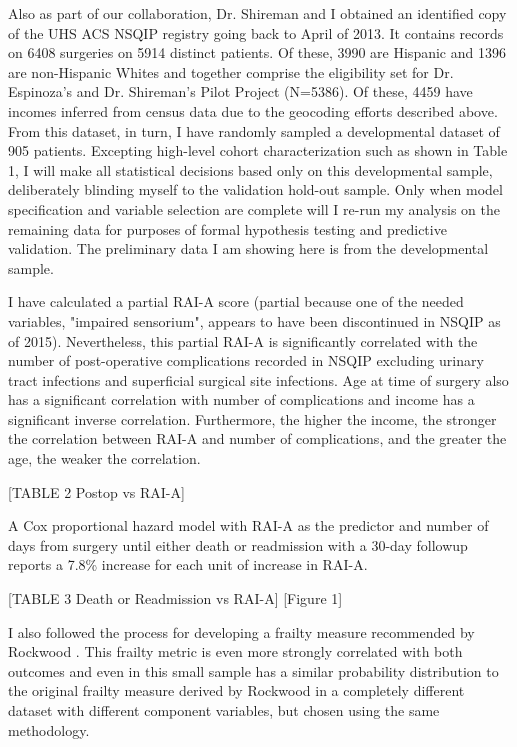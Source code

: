 Also as part of our collaboration, Dr. Shireman and I obtained an identified copy of the UHS ACS NSQIP registry going back to April of 2013. It contains records on 6408 surgeries on 5914 distinct patients. Of these, 3990 are Hispanic and 1396 are non-Hispanic Whites and together comprise the eligibility set for Dr. Espinoza's and Dr. Shireman's Pilot Project (N=5386). Of these, 4459 have incomes inferred from census data due to the geocoding efforts described above. From this dataset, in turn, I have randomly sampled a developmental dataset of 905 patients. Excepting high-level cohort characterization such as shown in Table 1, I will make all statistical decisions based only on this developmental sample, deliberately blinding myself to the validation hold-out sample. Only when model specification and variable selection are complete will I re-run my analysis on the remaining data for purposes of formal hypothesis testing and predictive validation. The preliminary data I am showing here is from the developmental sample.

I have calculated a partial RAI-A score (partial because one of the needed variables, "impaired sensorium", appears to have been discontinued in NSQIP as of 2015). Nevertheless, this partial RAI-A is significantly correlated with the number of post-operative complications recorded in NSQIP excluding urinary tract infections and superficial surgical site infections. Age at time of surgery also has a significant correlation with number of complications and income has a significant inverse correlation. Furthermore, the higher the income, the stronger the correlation between RAI-A and number of complications, and the greater the age, the weaker the correlation.

[TABLE 2 Postop vs RAI-A]

A Cox proportional hazard model with RAI-A as the predictor and number of days from surgery until either death or readmission with a 30-day followup reports a 7.8\% increase for each unit of increase in RAI-A.

[TABLE 3 Death or Readmission vs RAI-A] [Figure 1]

I also followed the process for developing a frailty measure recommended by Rockwood \cite{Rockwood_2005}. This frailty metric is even more strongly correlated with both outcomes and even in this small sample has a similar probability distribution to the original frailty measure derived by Rockwood \cite{Mitnitski_2001} in a completely different dataset with different component variables, but chosen using the same methodology.

